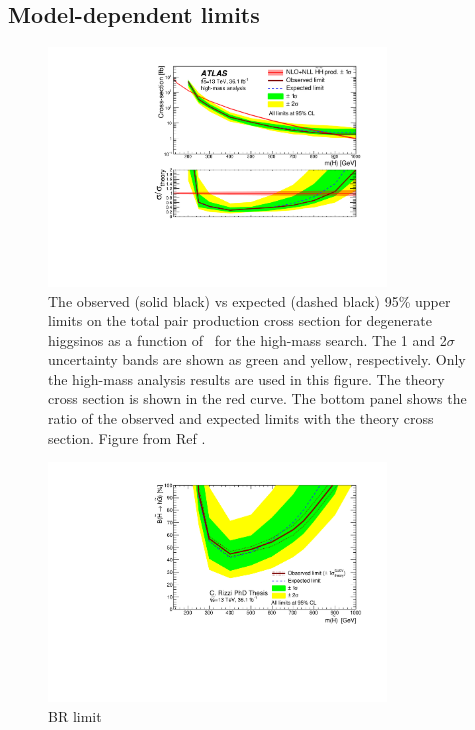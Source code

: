 \subsection{Model-dependent limits}
\label{sec:ewk:modeldep}

\begin{figure}[htbp]
	\centering
	\includegraphics[width=0.8\textwidth]{figures/ewk_prod/interpretation/limit_HM}
	\caption{The observed (solid black) vs expected (dashed black) 95\% upper limits on the total pair production cross section for degenerate higgsinos as a function of \mhino\ for the high-mass search. The 1 and 2$\sigma$ uncertainty bands are shown as green and yellow, respectively. Only the high-mass analysis results are used in this figure. The theory cross section is shown in the red curve. The bottom panel shows the ratio of the observed and expected limits with the theory cross section. Figure from Ref \cite{Aaboud:2018htj}.} 
	\label{fig:exclusion_high}
\end{figure}

\begin{figure}[htbp]
	\centering
	\includegraphics[width=0.8\textwidth]{figures/ewk_prod/interpretation/br_limit_HM.pdf}
	\caption{BR limit} 
	\label{fig:exclusion_high}
\end{figure}



